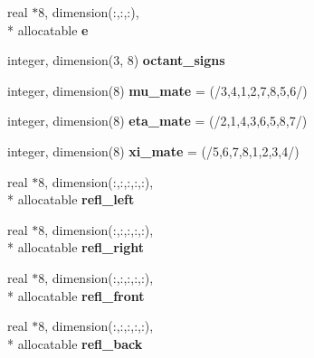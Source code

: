 \begin{DoxyCompactItemize}
\item 
\hypertarget{classsolvar_aa1e1a567ef430e8ff6f3890af88d4826}{real $\ast$8, dimension(\-:,\-:,\-:), \\*
allocatable {\bfseries e}}\label{classsolvar_aa1e1a567ef430e8ff6f3890af88d4826}

\item 
\hypertarget{classsolvar_ad8e22ecd26537a488344e0b4d5692675}{integer, dimension(3, 8) {\bfseries octant\-\_\-signs}}\label{classsolvar_ad8e22ecd26537a488344e0b4d5692675}

\item 
\hypertarget{classsolvar_ae96623c0c9a05f10c4c68858ef955476}{integer, dimension(8) {\bfseries mu\-\_\-mate} = (/3,4,1,2,7,8,5,6/)}\label{classsolvar_ae96623c0c9a05f10c4c68858ef955476}

\item 
\hypertarget{classsolvar_a0a51963d6f84ac9df3a98b2efd1099c4}{integer, dimension(8) {\bfseries eta\-\_\-mate} = (/2,1,4,3,6,5,8,7/)}\label{classsolvar_a0a51963d6f84ac9df3a98b2efd1099c4}

\item 
\hypertarget{classsolvar_aaeb65d203faa02300a49bb400e576c39}{integer, dimension(8) {\bfseries xi\-\_\-mate} = (/5,6,7,8,1,2,3,4/)}\label{classsolvar_aaeb65d203faa02300a49bb400e576c39}

\item 
\hypertarget{classsolvar_ad3a53395e3333a8e8e138cd094a3403d}{real $\ast$8, dimension(\-:,\-:,\-:,\-:,\-:), \\*
allocatable {\bfseries refl\-\_\-left}}\label{classsolvar_ad3a53395e3333a8e8e138cd094a3403d}

\item 
\hypertarget{classsolvar_aad1bed62bafbe160974cd834e8e7f77f}{real $\ast$8, dimension(\-:,\-:,\-:,\-:,\-:), \\*
allocatable {\bfseries refl\-\_\-right}}\label{classsolvar_aad1bed62bafbe160974cd834e8e7f77f}

\item 
\hypertarget{classsolvar_a8492bd105ee9f2e0829e19bd6b105a26}{real $\ast$8, dimension(\-:,\-:,\-:,\-:,\-:), \\*
allocatable {\bfseries refl\-\_\-front}}\label{classsolvar_a8492bd105ee9f2e0829e19bd6b105a26}

\item 
\hypertarget{classsolvar_ab0835a028d0ae4651e76dec71eeb8352}{real $\ast$8, dimension(\-:,\-:,\-:,\-:,\-:), \\*
allocatable {\bfseries refl\-\_\-back}}\label{classsolvar_ab0835a028d0ae4651e76dec71eeb8352}


\end{DoxyCompactItemize}

